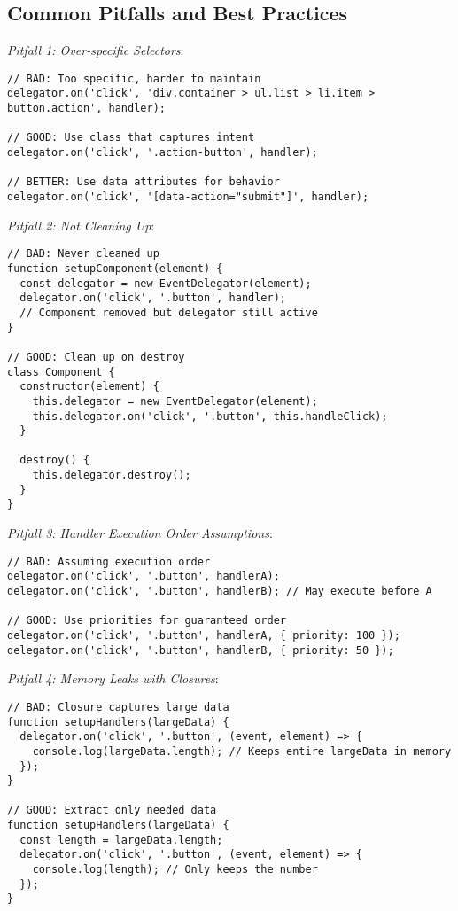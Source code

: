 \documentclass[11pt]{article}
\begin{document}
\subsection{Common Pitfalls and Best Practices}
\label{sec:org4e2182f}

\emph{Pitfall 1: Over-specific Selectors}:

\begin{verbatim}
// BAD: Too specific, harder to maintain
delegator.on('click', 'div.container > ul.list > li.item > button.action', handler);

// GOOD: Use class that captures intent
delegator.on('click', '.action-button', handler);

// BETTER: Use data attributes for behavior
delegator.on('click', '[data-action="submit"]', handler);
\end{verbatim}

\emph{Pitfall 2: Not Cleaning Up}:

\begin{verbatim}
// BAD: Never cleaned up
function setupComponent(element) {
  const delegator = new EventDelegator(element);
  delegator.on('click', '.button', handler);
  // Component removed but delegator still active
}

// GOOD: Clean up on destroy
class Component {
  constructor(element) {
    this.delegator = new EventDelegator(element);
    this.delegator.on('click', '.button', this.handleClick);
  }
  
  destroy() {
    this.delegator.destroy();
  }
}
\end{verbatim}

\emph{Pitfall 3: Handler Execution Order Assumptions}:

\begin{verbatim}
// BAD: Assuming execution order
delegator.on('click', '.button', handlerA);
delegator.on('click', '.button', handlerB); // May execute before A

// GOOD: Use priorities for guaranteed order
delegator.on('click', '.button', handlerA, { priority: 100 });
delegator.on('click', '.button', handlerB, { priority: 50 });
\end{verbatim}

\emph{Pitfall 4: Memory Leaks with Closures}:

\begin{verbatim}
// BAD: Closure captures large data
function setupHandlers(largeData) {
  delegator.on('click', '.button', (event, element) => {
    console.log(largeData.length); // Keeps entire largeData in memory
  });
}

// GOOD: Extract only needed data
function setupHandlers(largeData) {
  const length = largeData.length;
  delegator.on('click', '.button', (event, element) => {
    console.log(length); // Only keeps the number
  });
}
\end{verbatim}
\end{document}
